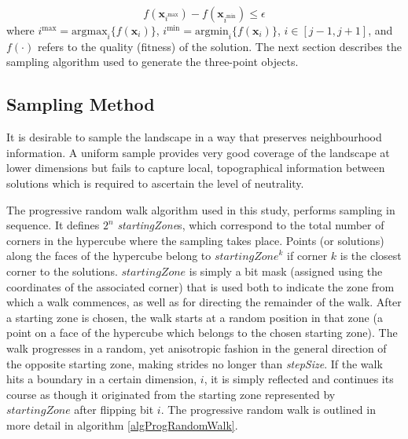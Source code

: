 \documentclass[conference]{IEEEtran}
\renewcommand{\vec}[1]{\mathbf{#1}}
\begin{document}
\begin{equation}
\label{eqNeutralityDef}
	f(\vec{x}_{i^{\text{max}}}) - f(\vec{x}_{i^{\text{min}}}) \le \epsilon			 
\end{equation}
where $i^{\text{max}} = \text{argmax}_i\{f(\vec{x}_i)\}$, $i^{\text{min}} = \text{argmin}_i\{f(\vec{x}_i)\}$, $i \in [j-1,j+1]$, and $f(\cdot)$ refers to the quality (fitness) of the solution. The next section describes the sampling algorithm used to generate the three-point objects.

\subsection{Sampling Method}
\label{sampling}
It is desirable to sample the landscape in a way that preserves neighbourhood information. A uniform sample provides very good coverage of the landscape at lower dimensions but fails to capture local, topographical information between solutions which is required to ascertain the level of neutrality. 

The progressive random walk \cite{malan2014progressive} algorithm used in this study, performs sampling in sequence. It defines $2^n$ \textit{startingZone}s, which correspond to the total number of corners in the hypercube where the sampling takes place. Points (or solutions) along the faces of the hypercube belong to $\textit{startingZone}^{k}$ if corner $k$ is the closest corner to the solutions. $startingZone$ is simply a bit mask (assigned using the coordinates of the associated corner) that is used both to indicate the zone from which a walk commences, as well as for directing the remainder of the walk. After a starting zone is chosen, the walk starts at a random position in that zone (a point on a face of the hypercube which belongs to the chosen starting zone). The walk progresses in a random, yet anisotropic fashion in the general direction of the opposite starting zone, making strides no longer than \textit{stepSize}. If the walk hits a boundary in a certain dimension, $i$, it is simply reflected and continues its course as though it originated from the starting zone represented by $startingZone$ after flipping bit $i$. The progressive random walk is outlined in more detail in algorithm \ref{algProgRandomWalk}.
\end{document}
